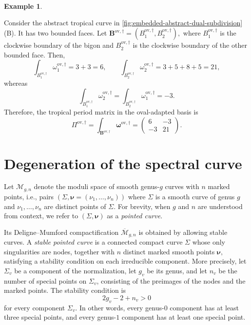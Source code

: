 \documentclass[12pt]{amsart}
\numberwithin{equation}{section}
\theoremstyle{definition}
\newtheorem{example}[theorem]{Example}
\def\trop{\dagger}
\def\mcurve{\Sigma}
\begin{document}
\begin{example}\label{eg:tropical_period_matrix}

Consider the abstract tropical curve in
\cref{fig:embedded-abstract-dual-subdivision}(B).
It has two bounded faces. Let
$
\bm B^{\mathrm{ov},\trop}
=
(
B_1^{\mathrm{ov},\trop},
B_2^{\mathrm{ov},\trop}
),
$
where $B_1^{\mathrm{ov},\trop}$ is the clockwise boundary of the bigon
and $B_2^{\mathrm{ov},\trop}$ is the clockwise boundary of the other
bounded face. Then,
\[
\int_{B_1^{\mathrm{ov},\trop}}
\omega_1^{\mathrm{ov},\trop}
=
3+3=6,
\qquad
\int_{B_2^{\mathrm{ov},\trop}}
\omega_2^{\mathrm{ov},\trop}
=
3+5+8+5=21,
\]
whereas
\[
\int_{B_1^{\mathrm{ov},\trop}}
\omega_2^{\mathrm{ov},\trop}
=
\int_{B_2^{\mathrm{ov},\trop}}
\omega_1^{\mathrm{ov},\trop}
=
-3.
\]
Therefore, the tropical period matrix in the oval-adapted basis is
\[
\Pi^{\mathrm{ov},\trop}
=
\int_{\bm B^{\mathrm{ov},\trop}}
\bm\omega^{\mathrm{ov},\trop}
=
\begin{pmatrix}
6 & -3\\
-3 & 21
\end{pmatrix}.
\]

\end{example}



\section{Degeneration of the spectral curve}
\label{sec:plumbing}


Let $\mathcal M_{g,n}$ denote the moduli space of smooth genus-$g$ curves with $n$ marked points, i.e., pairs $(\mcurve,\bm \nu = (\nu_1,\dots,\nu_n))$ where $\mcurve$ is a smooth curve of genus $g$ and $\nu_1,\dots,\nu_n$ are distinct points of $\mcurve$. For brevity, when $g$ and $n$ are understood from context, we refer to $(\mcurve,\bm \nu)$ as a \emph{pointed curve}.

Its Deligne--Mumford compactification $\overline{\mathcal M}_{g,n}$ is obtained by allowing
stable curves. A \emph{stable pointed curve} is a connected compact curve $\mcurve$
whose only singularities are nodes, together with $n$ distinct marked
smooth points
$
\bm \nu,
$
satisfying a stability condition on each irreducible component.
More precisely, let $\mcurve_v$ be a component of the normalization,
let $g_v$ be its genus, and let $n_v$ be the number of special points
on $\mcurve_v$, consisting of the preimages of the nodes and the marked
points. The stability condition is
\[
2g_v-2+n_v>0
\]
for every component $\mcurve_v$. In other words, every genus-$0$ component has at least
three special points, and every genus-$1$ component has at least one special point.
\end{document}
